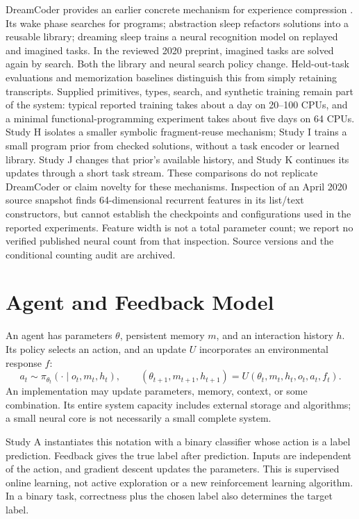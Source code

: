 \documentclass[11pt]{article}
\begin{document}
DreamCoder provides an earlier concrete mechanism for experience compression
\cite{dreamcoder}. Its wake phase searches for programs; abstraction sleep
refactors solutions into a reusable library; dreaming sleep trains a neural
recognition model on replayed and imagined tasks. In the reviewed 2020
preprint, imagined tasks are solved again by search. Both the library and
neural search policy change. Held-out-task evaluations and memorization
baselines distinguish this from simply retaining transcripts. Supplied
primitives, types, search, and synthetic training remain part of the system:
typical reported training takes about a day on 20--100 CPUs, and a minimal
functional-programming experiment takes about five days on 64 CPUs. Study H
isolates a smaller symbolic fragment-reuse mechanism; Study I trains a small
program prior from checked solutions, without a task encoder or learned
library. Study J changes that prior's available history, and Study K continues its
updates through a short task stream. These comparisons
do not replicate DreamCoder or claim novelty for these mechanisms.
Inspection of an April 2020 source snapshot finds 64-dimensional recurrent
features in its list/text constructors, but cannot establish the checkpoints
and configurations used in the reported experiments. Feature width is not a
total parameter count; we report no verified published neural count from that
inspection. Source versions and the conditional counting audit are archived.

\section{Agent and Feedback Model}
An agent has parameters $\theta$, persistent memory $m$, and an interaction
history $h$. Its policy selects an action, and an update $U$ incorporates an
environmental response $f$:
\[
 a_t\sim\pi_{\theta_t}(\cdot\mid o_t,m_t,h_t),\qquad
 (\theta_{t+1},m_{t+1},h_{t+1})=U(\theta_t,m_t,h_t,o_t,a_t,f_t).
\]
An implementation may update parameters, memory, context, or some combination.
Its entire system capacity includes external storage and algorithms; a small
neural core is not necessarily a small complete system.

Study A instantiates this notation with a binary classifier whose action is a
label prediction. Feedback gives the true label after prediction. Inputs are
independent of the action, and gradient descent updates the parameters. This
is supervised online learning, not active exploration or a new reinforcement
learning algorithm. In a binary task, correctness plus the chosen label also
determines the target label.
\end{document}
